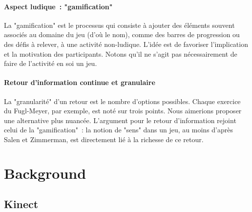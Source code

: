 \documentclass[french,12pt]{report}
\begin{document}
		\subsubsection{Aspect ludique~: "gamification"}
		La "gamification" est le processus qui consiste à ajouter des éléments 
		souvent associés au domaine du jeu (d'où le nom), comme des barres de
		progression ou des défis à relever, à une activité non-ludique. L'idée est 
		de favoriser l'implication et la motivation des participants. 
		Notons qu'il ne s'agit pas nécessairement de faire de l'activité en soi un 
		jeu.
    \subsubsection{Retour d'information continue et granulaire}
    La "granularité" d'un retour est le nombre d'options possibles. 
    Chaque exercice du Fugl-Meyer, par exemple, est noté sur trois points. Nous 
    aimerions proposer une alternative plus nuancée.
    L'argument pour le retour d'information rejoint celui de la "gamification"~:
    la notion de "sens" dans un jeu, au moins d'après Salen et Zimmerman, est 
    directement lié à la richesse de ce retour.

	\chapter{Background}
	
	
		\section{Kinect}
\end{document}
